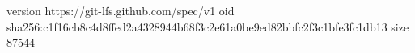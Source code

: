 version https://git-lfs.github.com/spec/v1
oid sha256:c1f16cb8c4d8ffed2a4328944b68f3c2e61a0be9ed82bbfc2f3c1bfe3fc1db13
size 87544
